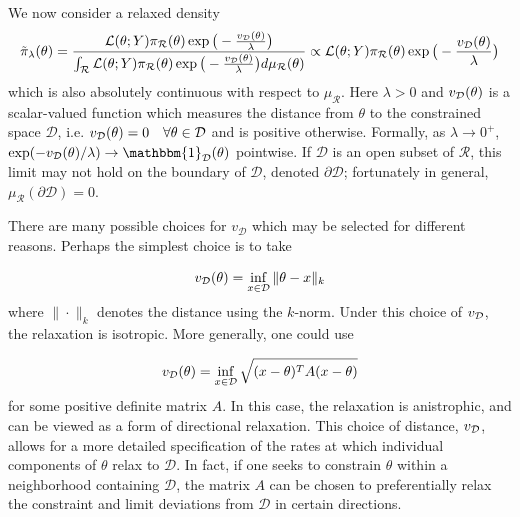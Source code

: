 \documentclass[10pt,fleqn]{article} \pdfoutput=1
\DeclareMathOperator{\1}{\mathbbm{1}} \DeclareMathOperator{\bigO}{\mc O}
\begin{document}
We now consider a relaxed density
\begin{equation}
	\label{EQ:relaxedDensityPosMeasure}
\tilde{\pi}_\lambda(\theta) =
	\frac{\mathcal{L}(\theta; Y)\pi_\mathcal{R}(\theta)\exp\big(-\frac{v_{\mathcal{D}}(\theta)}{\lambda}\big)}{\int_{\mathcal{R}}\mathcal{L}(\theta; Y)
		\pi_\mathcal{R}(\theta)\exp\big(-\frac{v_{\mathcal{D}}(\theta)}{\lambda}\big) d\mu_\mathcal{R}(\theta)} \propto
	\mathcal{L}(\theta; Y)
	\pi_\mathcal{R}(\theta)\exp\big(-\frac{v_{\mathcal{D}}(\theta)}{\lambda}\big)
				\end{equation}
which is also absolutely continuous
with respect to $\mu_\mathcal{R}.$ Here $\lambda >0$ and $v_{\mathcal{D}}(\theta)$ is a scalar-valued function which measures the distance
from $\theta$ to the constrained space $\mathcal{D}$, i.e.  $v_{\mathcal{D}}(\theta) = 0 \quad \forall \theta \in \mathcal{D}$ and is
positive otherwise.  Formally, as $\lambda \to 0^+$, $\exp(-v_{\mc
	D}(\theta)/\lambda) \to \mathbbm{1}_\mathcal{D}(\theta)$ pointwise.
If $\mathcal{D}$ is an open subset of $\mathcal{R}$, this limit may
not hold on the boundary of $\mathcal{D}$, denoted $\partial
	\mathcal{D}$; fortunately in general, $\mu_\mathcal{R}(\partial
	\mathcal{D}) = 0$.

There are many possible choices for $v_{\mathcal D}$ which may be selected for
different reasons.  Perhaps the simplest choice is to take

\begin{equation}
	\label{EQ:Isotrophic_relaxation} v_{\mathcal{D}}(\theta) =
	\inf_{x\in\mathcal{D}} \|\theta-x\|_k
\end{equation}
where $\|\cdot\|_k$ denotes the distance using the $k$-norm.
Under this choice of $v_{\mathcal{D}}$, the relaxation is isotropic. More generally,
one could use

\begin{equation} v_{\mathcal{D}}(\theta) = \inf_{x\in\mathcal{D}}
	\sqrt{(x-\theta)^T A (x-\theta)}\label{EQ:anistrophic_relaxation}
\end{equation}
for some positive definite matrix $A$. In this case, the
relaxation is anistrophic, and can be viewed as a form of directional
relaxation. This choice of distance, $v_{\mathcal{D}}$, allows for a more detailed
specification of the rates at which individual components of $\theta$ relax
to $\mathcal{D}$.  In fact, if one seeks to constrain $\theta$ within a
neighborhood containing $\mathcal{D}$, the matrix $A$ can be chosen to
preferentially relax the constraint and limit deviations from $\mathcal{D}$
in certain directions.
\end{document}
